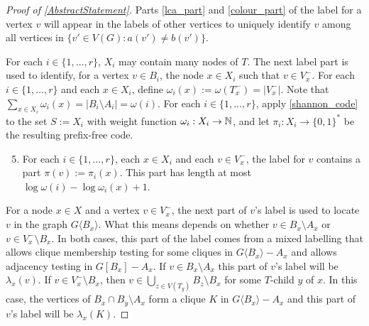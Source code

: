 \documentclass{patmorin}
\newcommand{\torso}[2]{{#1}\langle{#2}\rangle}
\begin{document}
\begin{proof}[Proof of \cref{AbstractStatement}]
    Parts \ref{lca_part} and \ref{colour_part} of the label for a vertex $v$ will appear in the labels of other vertices to uniquely identify $v$ among all vertices in $\{v'\in V(G):a(v')\neq b(v')\}$.

    For each $i\in\{1,\ldots,r\}$, $X_i$ may contain many nodes of $T$.  The next label part is used to identify, for a vertex $v\in B_i$, the node $x\in X_i$ such that $v\in V^-_x$. For each $i\in\{1,\ldots,r\}$ and each $x\in X_i$, define $\omega_i(x):=\omega(T^-_x)=|V^-_x|$. Note that $\sum_{x\in X_i}\omega_i(x)=|B_i\setminus A_i|=\omega(i)$. For each $i\in\{1,\ldots,r\}$,  apply \cref{shannon_code} to the set $S:=X_i$ with weight function $\omega_i:X_i\to\mathbb{N}$, and let $\pi_i:X_i\to\{0,1\}^*$  be the resulting prefix-free code.

    \begin{enumerate}[nosep,nolistsep,label=(P\arabic*)]\setcounter{enumi}{4}
      \item\label{pi_part} For each $i\in\{1,\ldots,r\}$, each $x\in X_i$ and each $v\in V^-_x$, the label for $v$ contains a part $\pi(v):=\pi_i(x)$. This part has length at most $\log \omega(i)-\log\omega_i(x)+1$.
    \end{enumerate}

    For a node $x\in X$ and a vertex $v\in V^-_x$, the next part of $v$'s label is used to locate $v$ in the graph $\torso{G}{B_x}$.  What this means depends on whether $v\in B_x\setminus A_x$ or $v\in V^-_x\setminus B_x$.  In both cases, this part of the label comes from a mixed labelling that allows clique membership testing for some cliques in $\torso{G}{B_x}-A_x$ and allows adjacency testing in $G[B_x]-A_x$.  If $v\in B_x\setminus A_x$ this part of $v$'s label will be $\lambda_x(v)$.  If $v\in V^-_x\setminus B_x$, then $v\in\bigcup_{z\in V(T_y)}B_z\setminus B_x$ for some $T$-child $y$ of $x$.  In this case, the vertices of $B_x\cap B_y\setminus A_x$ form a clique $K$ in $\torso{G}{B_x}-A_x$ and this part of $v$'s label will be $\lambda_x(K)$.


\end{proof}
\end{document}

